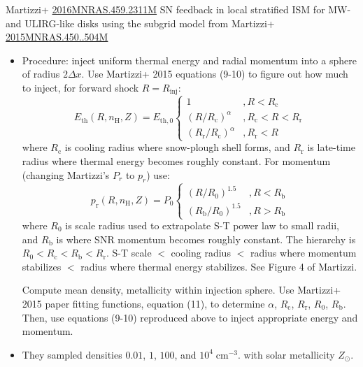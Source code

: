 \documentclass[10pt]{article}
\newcommand*{\mt}{\mathrm}
\newcommand*{\unit}[1]{\;\mt{#1}}  %
\newcommand*{\sun}{\odot}
\begin{document}
Martizzi+ \href{https://ui.adsabs.harvard.edu/abs/2016MNRAS.459.2311M/abstract}{2016MNRAS.459.2311M}
SN feedback in local stratified ISM for MW- and ULIRG-like disks
using the subgrid model from Martizzi+
\href{https://ui.adsabs.harvard.edu/abs/2015MNRAS.450..504M/abstract}{2015MNRAS.450..504M}
\begin{itemize}
    \item Procedure: inject uniform thermal energy and radial momentum into a
        sphere of radius $2 \Delta x$.  Use Martizzi+ 2015 equations (9-10) to
        figure out how much to inject, for forward shock $R = R_\mt{inj}$:
\[
    E_\mt{th}\left(R, n_\mt{H}, Z\right) = E_\mt{th,0}
    \begin{cases}
        1                                       &, R < R_\mt{c} \\
        \left(R / R_\mt{c}\right)^\alpha        &, R_\mt{c} < R < R_\mt{r} \\
        \left(R_\mt{r} / R_\mt{c}\right)^\alpha &, R_\mt{r} < R
    \end{cases}
\]
        where $R_\mt{c}$ is cooling radius where snow-plough shell forms, and
        $R_\mt{r}$ is late-time radius where thermal energy becomes roughly
        constant.  For momentum (changing Martizzi's $P_r$ to $p_r$) use:
\[
    p_\mt{r}\left(R, n_\mt{H}, Z\right) = P_\mt{0}
    \begin{cases}
        \left(R / R_0\right)^{1.5}      &, R < R_\mt{b} \\
        \left(R_\mt{b}/R_0\right)^{1.5} &, R > R_\mt{b}
    \end{cases}
\]
        where $R_0$ is scale radius used to extrapolate S-T power law to small
        radii, and $R_\mt{b}$ is where SNR momentum becomes roughly constant.
        The hierarchy is $R_0 < R_\mt{c} < R_\mt{b} < R_\mt{r}$.
        S-T scale $<$  cooling radius $<$ radius where momentum stabilizes $<$
        radius where thermal energy stabilizes.  See Figure 4 of Martizzi.

        Compute mean density, metallicity within injection sphere.
        Use Martizzi+ 2015 paper fitting functions, equation (11), to determine
        $\alpha$, $R_\mt{c}$, $R_\mt{r}$, $R_0$, $R_\mt{b}$.
        Then, use equations (9-10) reproduced above to inject appropriate
        energy and momentum.

    \item They sampled densities $0.01$, $1$, $100$, and $10^4 \unit{cm^{-3}}$.
        with solar metallicity $Z_\sun$.


\end{itemize}
\end{document}
